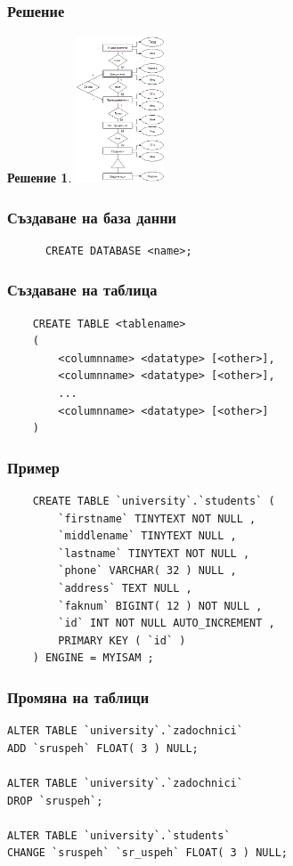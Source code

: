 \documentclass{beamer}
\newtheorem{solv}{Решение}
\begin{document}
  \begin{frame}
    \frametitle{Решение}
    \begin{solv}
      \includegraphics[width=100px]{img/problem1}
    \end{solv}
  \end{frame}

\begin{frame}[fragile]
\frametitle{Създаване на база данни}
\begin{block}{}
\begin{lstlisting}
      CREATE DATABASE <name>;
\end{lstlisting}
\end{block}
\end{frame}

\begin{frame}[fragile]
\frametitle{Създаване на таблица}
\begin{block}{}
\begin{lstlisting}
    CREATE TABLE <tablename>
    (
        <columnname> <datatype> [<other>],
        <columnname> <datatype> [<other>],
        ...
        <columnname> <datatype> [<other>]
    )
\end{lstlisting}
\end{block}
\end{frame}

\begin{frame}[fragile]
\frametitle{Пример}
\begin{block}{}
\begin{lstlisting}
	CREATE TABLE `university`.`students` (
		`firstname` TINYTEXT NOT NULL ,
		`middlename` TINYTEXT NULL ,
		`lastname` TINYTEXT NOT NULL ,
		`phone` VARCHAR( 32 ) NULL ,
		`address` TEXT NULL ,
		`faknum` BIGINT( 12 ) NOT NULL ,
		`id` INT NOT NULL AUTO_INCREMENT ,
		PRIMARY KEY ( `id` )
	) ENGINE = MYISAM ;
\end{lstlisting}
\end{block}
\end{frame}

\begin{frame}[fragile]
\frametitle{Промяна на таблици}
\begin{block}{}
\begin{lstlisting}
ALTER TABLE `university`.`zadochnici`
ADD `sruspeh` FLOAT( 3 ) NULL;

ALTER TABLE `university`.`zadochnici`
DROP `sruspeh`;

ALTER TABLE `university`.`students`
CHANGE `sruspeh` `sr_uspeh` FLOAT( 3 ) NULL;
\end{lstlisting}
\end{block}
\end{frame}
 
  
\end{document}
